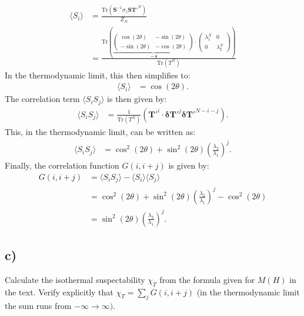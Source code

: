 \documentclass[a4paper]{article}
\newcommand{\trace}{\text{Tr}}
\newcommand{\average}[1]{\langle #1 \rangle}
\begin{document}
\begin{align*}
    \average{S_i} &= \frac{\trace\left(\mathbf{S}^{-1}\sigma_z\mathbf{S}\mathbf{T}'^N\right)}{Z_N}\\
    &= \frac{\trace\left(\underbrace{\begin{pmatrix}
        \cos(2\theta) & -\sin(2\theta)\\
        -\sin(2\theta) &-\cos(2\theta)
    \end{pmatrix}}_{=\mathbf{\delta}}\cdot\begin{pmatrix}
        \lambda_1^N & 0\\
        0 & \lambda_2^N
    \end{pmatrix}\right)}{\trace\left(T^N\right)}
\end{align*}In the thermodynamic limit, this then simplifies to:
\begin{align*}
    \average{S_i} &= \cos(2\theta).
\end{align*}The correlation term $\average{S_iS_j}$ is then given by:
\begin{align*}
    \average{S_iS_j} &= \frac{1}{\trace\left(T^N\right)}\left(\mathbf{T}'^i\cdot \mathbf{\delta}\mathbf{T}'^j\mathbf{\delta}\mathbf{T}'^{N - i - j}\right).
\end{align*}This, in the thermodynamic limit, can be written as:
\begin{align*}
    \average{S_iS_j} &= \cos^2(2\theta) + \sin^2(2\theta)\left(\frac{\lambda_2}{\lambda_1}\right)^j.
\end{align*}Finally, the correlation function $G(i, i + j)$ is given by:
\begin{align*}
    G(i, i + j) &=\average{S_iS_j} - \average{S_i}\average{S_j}\\
    &=\cos^2(2\theta) + \sin^2\left(2\theta\right)\left(\frac{\lambda_2}{\lambda_1}\right)^j - \cos^2\left(2\theta\right)\\
    &= \sin^2\left(2\theta\right)\left(\frac{\lambda_2}{\lambda_1}\right)^j.
\end{align*}

\subsection*{c)}
Calculate the isothermal suspectability $\chi_T$ from the formula given for $M(H)$ in the text.
Verify explicitly that $\chi_T = \sum_j G(i, i+j)$ (in the thermodynamic limit the sum runs from $-\infty\to\infty)$.
\end{document}
